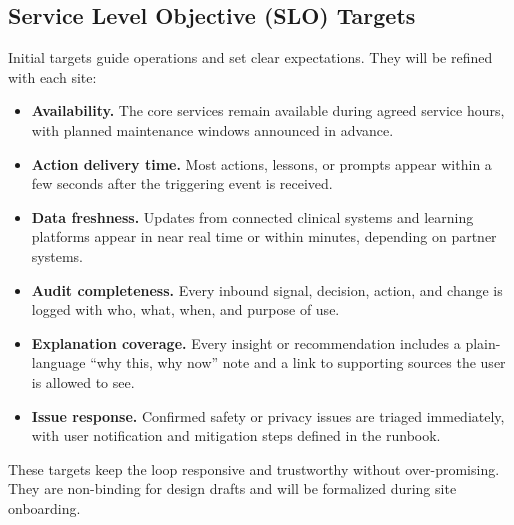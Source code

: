 \documentclass[12pt]{article}
\begin{document}
\subsection*{Service Level Objective (SLO) Targets}
Initial targets guide operations and set clear expectations. They will be refined with each site:
\begin{itemize}[leftmargin=*]
  \item \textbf{Availability.} The core services remain available during agreed service hours, with planned maintenance windows announced in advance.
  \item \textbf{Action delivery time.} Most actions, lessons, or prompts appear within a few seconds after the triggering event is received.
  \item \textbf{Data freshness.} Updates from connected clinical systems and learning platforms appear in near real time or within minutes, depending on partner systems.
  \item \textbf{Audit completeness.} Every inbound signal, decision, action, and change is logged with who, what, when, and purpose of use.
  \item \textbf{Explanation coverage.} Every insight or recommendation includes a plain-language “why this, why now” note and a link to supporting sources the user is allowed to see.
  \item \textbf{Issue response.} Confirmed safety or privacy issues are triaged immediately, with user notification and mitigation steps defined in the runbook.
\end{itemize}
These targets keep the loop responsive and trustworthy without over-promising. They are non-binding for design drafts and will be formalized during site onboarding.
\end{document}

